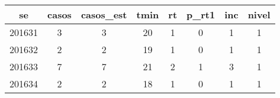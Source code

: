 \begin{tabular}{c|ccccccc}
  \hline
se & casos & casos\_est & tmin & rt & p\_rt1 & inc & nivel \\ 
  \hline
201631 & 3 & 3 & 20 & 1 & 0 & 1 & 1 \\ 
  201632 & 2 & 2 & 19 & 1 & 0 & 1 & 1 \\ 
  201633 & 7 & 7 & 21 & 2 & 1 & 3 & 1 \\ 
  201634 & 2 & 2 & 18 & 1 & 0 & 1 & 1 \\ 
   \hline
\end{tabular}
